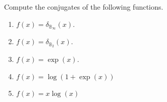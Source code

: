 \documentclass[10pt]{article}
\begin{document}
\maketitle


\begin{problem}[Problem 1]
Compute the conjugates of the following functions.  
\begin{enumerate}[label=(\alph*),nolistsep]
\item \( f(x) = \delta_{\mathbb{B}_{\infty}}(x) \).
\item \( f(x) = \delta_{\mathbb{B}_{2}}(x) \).
\item \( f(x) = \exp(x) \).
\item \( f(x) =  \log(1+\exp(x)) \)
\item \( f(x) = x\log(x) \)
\end{enumerate}
\end{problem}
\end{document}

